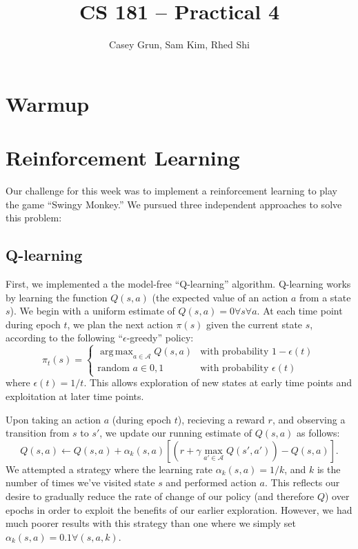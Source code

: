 \documentclass[11pt]{amsart}
\title{CS 181 -- Practical 4}
\author{Casey Grun, Sam Kim, Rhed Shi}
\DeclareMathOperator*{\argmax}{arg\,max}
\begin{document}
\maketitle

\section{Warmup}

\section{Reinforcement Learning}

Our challenge for this week was to implement a reinforcement learning to play
the game ``Swingy Monkey.'' We pursued three independent approaches to solve this 
problem:

\subsection{Q-learning}

First, we implemented a the model-free ``Q-learning'' algorithm. Q-learning works
by learning the function $Q(s,a)$ (the expected value of an action $a$ from a 
state $s$). We begin with a uniform estimate of $Q(s,a) = 0 \forall s \forall a$.
At each time point during epoch $t$, we plan the next action $\pi(s)$ given the 
current state $s$, according to the following ``$\epsilon$-greedy'' policy:
$$\pi_t(s) = \begin{cases} 
\argmax_{a \in \mathcal{A}} Q(s,a) & \text{with probability } 1-\epsilon(t) \\
\text{random } a \in {0,1}         & \text{with probability } \epsilon(t) 
\end{cases}$$
where $\epsilon(t) = 1/t$. This allows exploration of new states at early time 
points and exploitation at later time points.

Upon taking an action $a$ (during epoch $t$), recieving a reward $r$, and observing a transition from $s$
to $s'$, we update our running estimate of $Q(s,a)$ as follows:
$$Q(s,a) \gets Q(s,a) + \alpha_k(s,a) \left[ (r + \gamma \max_{a' \in \mathcal{A}} Q(s', a')) - Q(s,a) \right].$$
We attempted a strategy where the learning rate $\alpha_k(s,a) = 1/k$, and $k$ is the number of times we've visited state $s$ and performed action $a$. This reflects our desire to gradually reduce the rate of change of our 
policy (and therefore $Q$) over epochs in order to exploit the benefits of our earlier exploration. However, we had much poorer results with this strategy than one where we simply set $\alpha_k(s,a) = 0.1 \forall(s,a,k)$.
\end{document}
